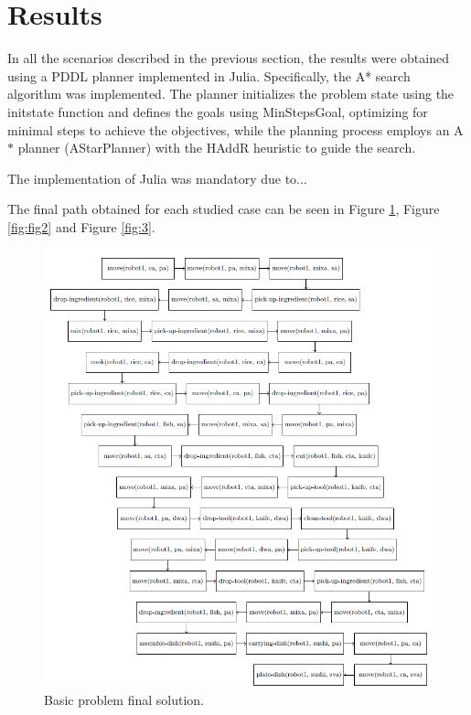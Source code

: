 \section{Results}
In all the scenarios described in the previous section, the results were obtained using a PDDL planner implemented in Julia. 
Specifically, the A* search algorithm was implemented. The planner initializes the problem state using the initstate function and 
defines the goals using MinStepsGoal, optimizing for minimal steps to achieve the objectives, while the planning process employs an A$*$ 
planner (AStarPlanner) with the HAddR heuristic to guide the search.


The implementation of Julia was mandatory due to...


The final path obtained for each studied case can be seen in Figure \ref{fig:fig1}, Figure \ref{fig:fig2} and Figure \ref{fig:3}.

\begin{figure}[t]
    \centering
    \includegraphics[width=1\linewidth]{fig1.png}
    \caption{Basic problem final solution.}
    \label{fig:fig1}
  \end{figure}

